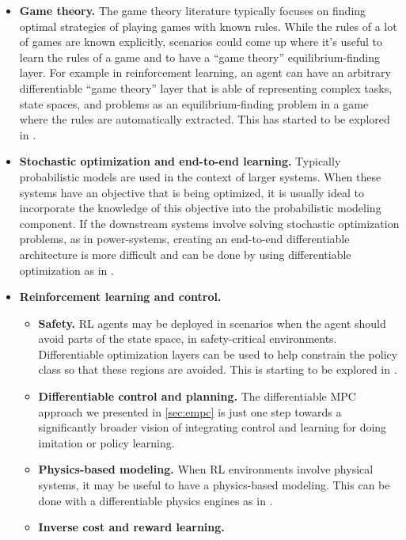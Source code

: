 \begin{itemize}
\item \textbf{Game theory.}
  The game theory literature typically focuses on finding
  optimal strategies of playing games with known rules.
  While the rules of a lot of games are known explicitly,
  scenarios could come up where it's useful to learn the
  rules of a game and to have a ``game theory''
  equilibrium-finding layer.
  For example in reinforcement learning, an agent can have an
  arbitrary differentiable ``game theory'' layer that is able
  of representing complex tasks, state spaces, and
  problems as an equilibrium-finding problem in a game
  where the rules are automatically extracted.
  This has started to be explored in
  \citet{ling2018game}.
\item \textbf{Stochastic optimization and end-to-end learning.}
  Typically probabilistic models are used in the context of
  larger systems. When these systems have an objective
  that is being optimized, it is usually ideal to incorporate
  the knowledge of this objective into the probabilistic modeling
  component.
  If the downstream systems involve solving
  stochastic optimization problems, as in power-systems,
  creating an end-to-end differentiable architecture is
  more difficult and can be done by using
  differentiable optimization as in \citet{donti2017task}.
\item \textbf{Reinforcement learning and control.}
  \begin{itemize}
  \item \textbf{Safety.} RL agents may be deployed in scenarios when
    the agent should avoid parts of the state space,
    \eg in safety-critical environments.
    Differentiable optimization layers can be used
    to help constrain the policy class so that these
    regions are avoided.
    This is starting to be explored in
    \citet{dalal2018safe,pham2018optlayer}.
  \item \textbf{Differentiable control and planning.}
    The differentiable MPC approach we presented in \cref{sec:empc}
    is just one step towards a significantly broader vision
    of integrating control and learning for doing imitation
    or policy learning.
  \item \textbf{Physics-based modeling.}
    When RL environments involve physical systems,
    it may be useful to have a physics-based modeling.
    This can be done with a differentiable
    physics engines as in \citet{de2018end}.
  \item \textbf{Inverse cost and reward learning.}

\end{itemize}
\end{itemize}
